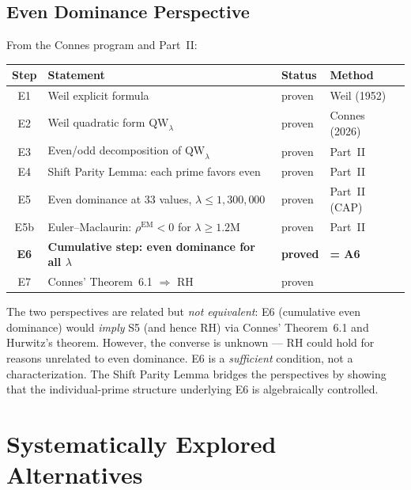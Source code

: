 \documentclass[12pt,a4paper]{article}
\theoremstyle{definition}
\theoremstyle{remark}
\begin{document}
\subsection{Even Dominance Perspective}

From the Connes program and Part~II:

\begin{center}
\renewcommand{\arraystretch}{1.2}
\begin{tabular}{c|l|l|l}
\textbf{Step} & \textbf{Statement} & \textbf{Status} & \textbf{Method} \\\hline
E1 & Weil explicit formula & proven & Weil (1952) \\
E2 & Weil quadratic form $\mathrm{QW}_\lambda$ & proven & Connes (2026) \\
E3 & Even/odd decomposition of $\mathrm{QW}_\lambda$ & proven & Part~II \\
E4 & Shift Parity Lemma: each prime favors even & proven & Part~II \\
E5 & Even dominance at $33$ values, $\lambda \leq 1{,}300{,}000$ & proven & Part~II (CAP) \\
E5b & Euler--Maclaurin: $\rho^{\mathrm{EM}} < 0$ for $\lambda \geq 1.2\mathrm{M}$ & proven & Part~II \\
\textbf{E6} & \textbf{Cumulative step: even dominance for all $\lambda$} & \textbf{proved} & \textbf{= A6} \\
E7 & Connes' Theorem~6.1 $\Rightarrow$ RH & proven & \cite{Connes2025}
\end{tabular}
\end{center}

\noindent The two perspectives are related but \emph{not equivalent}: E6 (cumulative even dominance) would \emph{imply} S5 (and hence RH) via Connes' Theorem~6.1 and Hurwitz's theorem. However, the converse is unknown --- RH could hold for reasons unrelated to even dominance. E6 is a \emph{sufficient} condition, not a characterization. The Shift Parity Lemma bridges the perspectives by showing that the individual-prime structure underlying E6 is algebraically controlled.


\needspace{8cm}
\section{Systematically Explored Alternatives}
\label{sec:explored-alternatives}
\end{document}
